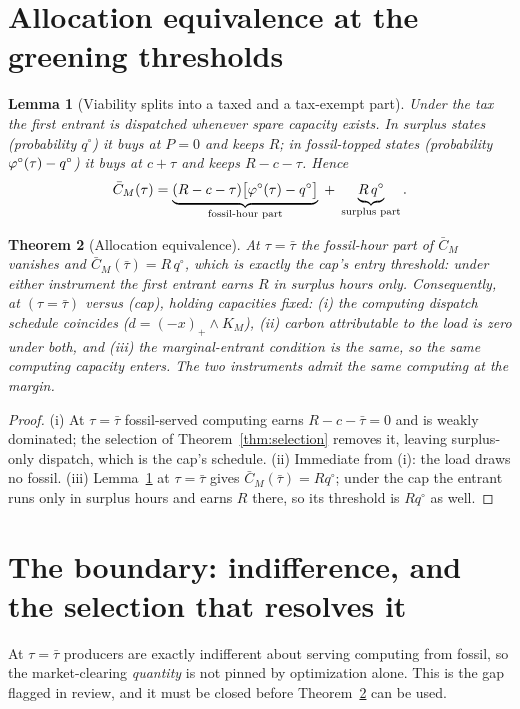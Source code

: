 \documentclass[11pt,reqno]{amsart}
\theoremstyle{plain}\newtheorem{theorem}{Theorem}\newtheorem{proposition}[theorem]{Proposition}
\newtheorem{lemma}[theorem]{Lemma}\newtheorem{corollary}[theorem]{Corollary}
\theoremstyle{definition}\newtheorem{definition}[theorem]{Definition}
\theoremstyle{remark}\newtheorem{remark}[theorem]{Remark}
\newcommand{\KR}{K_R}\newcommand{\KF}{K_F}\newcommand{\KM}{K_M}
\newcommand{\CM}{C_M}\newcommand{\CF}{C_F}\newcommand{\CR}{C_R}\newcommand{\Dbar}{\bar D}
\newcommand{\qo}{q^{\circ}}\newcommand{\FKR}{F_{\!\KR}}\newcommand{\eqdef}{\vcentcolon=}
\begin{document}
\section{Allocation equivalence at the greening thresholds}

\begin{lemma}[Viability splits into a taxed and a tax-exempt part]\label{lem:split}
Under the tax the first entrant is dispatched whenever spare capacity exists. In surplus
states (probability $\qo$) it buys at $P=0$ and keeps $R$; in fossil-topped states
(probability $\phio(\tau)-\qo$) it buys at $c+\tau$ and keeps $R-c-\tau$. Hence
\[
  \bar\CM(\tau)=\underbrace{(R-c-\tau)\big[\phio(\tau)-\qo\big]}_{\text{fossil-hour part}}
  \;+\;\underbrace{R\,\qo}_{\text{surplus part}} .
\]
\end{lemma}

\begin{theorem}[Allocation equivalence]\label{thm:equiv}
At $\tau=\bar\tau$ the fossil-hour part of $\bar\CM$ vanishes and
$\bar\CM(\bar\tau)=R\,\qo$, which is exactly the cap's entry threshold: under either
instrument the first entrant earns $R$ in surplus hours only. Consequently, at
$(\tau=\bar\tau)$ versus (cap), holding capacities fixed:
\textup{(i)} the computing dispatch schedule coincides ($d=(-x)_+\wedge\KM$),
\textup{(ii)} carbon attributable to the load is zero under both, and
\textup{(iii)} the marginal-entrant condition is the same, so the same computing capacity
enters. The two instruments admit the same computing at the margin.
\end{theorem}
\begin{proof}
(i) At $\tau=\bar\tau$ fossil-served computing earns $R-c-\bar\tau=0$ and is weakly
dominated; the selection of Theorem~\ref{thm:selection} removes it, leaving surplus-only
dispatch, which is the cap's schedule. (ii) Immediate from (i): the load draws no fossil.
(iii) Lemma~\ref{lem:split} at $\tau=\bar\tau$ gives $\bar\CM(\bar\tau)=R\qo$; under the cap
the entrant runs only in surplus hours and earns $R$ there, so its threshold is $R\qo$ as well.
\end{proof}

\section{The boundary: indifference, and the selection that resolves it}

At $\tau=\bar\tau$ producers are exactly indifferent about serving computing from fossil, so
the market-clearing \emph{quantity} is not pinned by optimization alone. This is the gap
flagged in review, and it must be closed before Theorem~\ref{thm:equiv} can be used.
\end{document}
